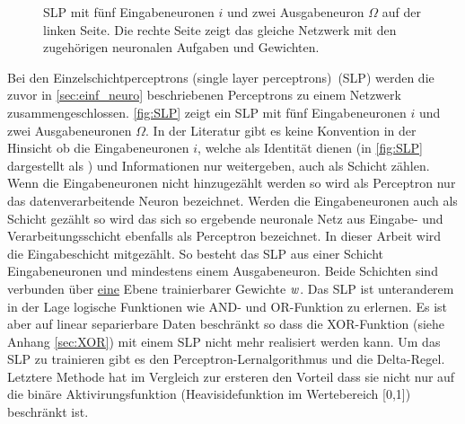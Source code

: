 \begin{figure}[!htb]
    \caption{SLP mit fünf Eingabeneuronen $i$ und zwei Ausgabeneuron $\Omega$ auf der linken Seite. Die rechte Seite zeigt das gleiche Netzwerk mit den zugehörigen neuronalen Aufgaben und Gewichten.}
    \label{fig:SLP}
\end{figure}
Bei den Einzelschichtperceptrons (single layer perceptrons)~(SLP) werden die zuvor in \autoref{sec:einf_neuro} beschriebenen Perceptrons zu einem Netzwerk zusammengeschlossen. \autoref{fig:SLP} zeigt ein SLP mit fünf Eingabeneuronen $i$ und zwei Ausgabeneuronen $\Omega$. In der Literatur gibt es keine Konvention in der Hinsicht ob die Eingabeneuronen $i$, welche als Identität dienen (in \autoref{fig:SLP} dargestellt als ) und Informationen nur weitergeben, auch als Schicht zählen. Wenn die Eingabeneuronen nicht hinzugezählt werden so wird als Perceptron nur das datenverarbeitende Neuron  bezeichnet. Werden die Eingabeneuronen auch als Schicht gezählt so wird das sich so ergebende neuronale Netz aus Eingabe- und Verarbeitungsschicht ebenfalls als Perceptron bezeichnet. In dieser Arbeit wird die Eingabeschicht mitgezählt. So besteht das SLP aus einer Schicht Eingabeneuronen und mindestens einem Ausgabeneuron. Beide Schichten sind verbunden über \underline{eine} Ebene trainierbarer Gewichte $\text{\textit{w}}$. Das SLP ist unteranderem in der Lage logische Funktionen wie AND- und OR-Funktion zu erlernen. Es ist aber auf linear separierbare Daten beschränkt so dass die XOR-Funktion (siehe Anhang \ref{sec:XOR}) mit einem SLP nicht mehr realisiert werden kann.
Um das SLP zu trainieren gibt es den Perceptron-Lernalgorithmus und die Delta-Regel. Letztere Methode hat im Vergleich zur ersteren den Vorteil dass sie nicht nur auf die binäre Aktivirungsfunktion (Heavisidefunktion im Wertebereich [0,1]) beschränkt ist.
\\

